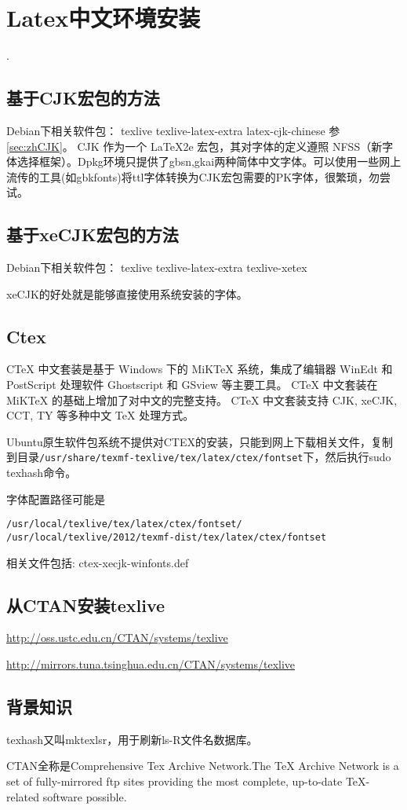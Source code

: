 
\section{Latex中文环境安装}
\label{sec:LatexInstall}.
\subsection{基于CJK宏包的方法}
Debian下相关软件包：
texlive texlive-latex-extra latex-cjk-chinese
参\ref{sec:zhCJK}。
CJK 作为一个 LaTeX2e 宏包，其对字体的定义遵照 NFSS（新字体选择框架）。Dpkg环境只提供了gbsn,gkai两种简体中文字体。可以使用一些网上流传的工具(如gbkfonts)将ttl字体转换为CJK宏包需要的PK字体，很繁琐，勿尝试。

\subsection{基于xeCJK宏包的方法}
Debian下相关软件包：
texlive texlive-latex-extra texlive-xetex

xeCJK的好处就是能够直接使用系统安装的字体。

\subsection{Ctex}
CTeX 中文套装是基于 Windows 下的 MiKTeX 系统，集成了编辑器 WinEdt 和 PostScript 处理软件 Ghostscript 和 GSview 等主要工具。 CTeX 中文套装在 MiKTeX 的基础上增加了对中文的完整支持。 CTeX 中文套装支持 CJK, xeCJK, CCT, TY 等多种中文 TeX 处理方式。

Ubuntu原生软件包系统不提供对CTEX的安装，只能到网上下载相关文件，复制到目录\verb+/usr/share/texmf-texlive/tex/latex/ctex/fontset+下，然后执行sudo texhash命令。

字体配置路径可能是
\begin{verbatim}
/usr/local/texlive/tex/latex/ctex/fontset/
/usr/local/texlive/2012/texmf-dist/tex/latex/ctex/fontset
\end{verbatim}
相关文件包括: ctex-xecjk-winfonts.def

\subsection{从CTAN安装texlive}
\url{http://oss.ustc.edu.cn/CTAN/systems/texlive}

\url{http://mirrors.tuna.tsinghua.edu.cn/CTAN/systems/texlive}

\subsection{背景知识}
texhash又叫mktexlsr，用于刷新ls-R文件名数据库。

CTAN全称是Comprehensive Tex Archive Network.The TeX Archive Network is a set of fully-mirrored ftp sites providing the most complete, up-to-date TeX-related software possible.





